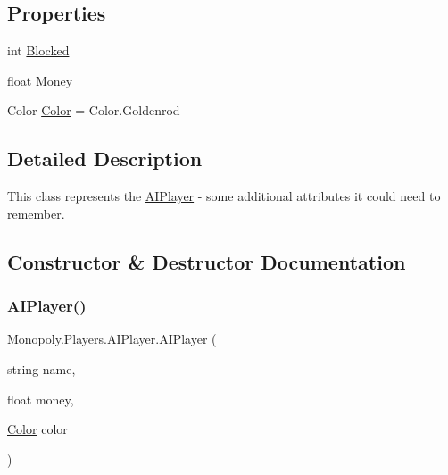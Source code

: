 \subsection*{Properties}
\begin{DoxyCompactItemize}
\item 
int \mbox{\hyperlink{class_monopoly_1_1_players_1_1_player_a39ba7c2c1b8f5cdf4c61d3df9653d515}{Blocked}}
\item 
float \mbox{\hyperlink{class_monopoly_1_1_players_1_1_player_aff8ece033d1cf30de1f2afcfc20dff97}{Money}}
\item 
Color \mbox{\hyperlink{class_monopoly_1_1_players_1_1_player_afcfd5b9c28b6ba4ce1e60e2e3baf7e31}{Color}} = Color.\+Goldenrod
\end{DoxyCompactItemize}


\subsection{Detailed Description}
This class represents the \mbox{\hyperlink{class_monopoly_1_1_players_1_1_a_i_player}{A\+I\+Player}} -\/ some additional attributes it could need to remember. 

\subsection{Constructor \& Destructor Documentation}
\mbox{\label{class_monopoly_1_1_players_1_1_a_i_player_abcfe138a31c6f2c27d0cfc2771700d39}} 
\subsubsection{\texorpdfstring{A\+I\+Player()}{AIPlayer()}}
{\footnotesize\ttfamily Monopoly.\+Players.\+A\+I\+Player.\+A\+I\+Player (\begin{DoxyParamCaption}\item[{string}]{name,  }\item[{float}]{money,  }\item[{\mbox{\hyperlink{class_monopoly_1_1_players_1_1_player_afcfd5b9c28b6ba4ce1e60e2e3baf7e31}{Color}}}]{color }\end{DoxyParamCaption})\hspace{0.3cm}{\ttfamily [inline]}}



